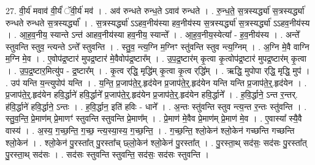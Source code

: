 \documentclass[17pt]{extarticle}
\begin{document}
27. वी॒र्य॑ मवाव॑ वी॒र्यं॑ ॅवी॒र्य॑ मव॑ । . अव॑ रुन्धते रुन्ध॒ते ऽवाव॑ रुन्धते । . रु॒न्ध॒ते॒ स॒त्रस्यर्द्ध्या॑ स॒त्रस्यर्द्ध्या॑ रुन्धते रुन्धते स॒त्रस्यर्द्ध्या᳚ । . स॒त्रस्यर्द्ध्या॑ ऽऽहव॒नीय॑स्या हव॒नीय॑स्य स॒त्रस्यर्द्ध्या॑ स॒त्रस्यर्द्ध्या॑ ऽऽहव॒नीय॑स्य । . आ॒ह॒व॒नीय॒ स्यान्ते ऽन्त॑ आहव॒नीय॑स्या हव॒नीय॒ स्यान्ते᳚ । . आ॒ह॒व॒नीय॒स्येत्या᳚ - ह॒व॒नीय॑स्य । . अन्ते᳚ स्तुवन्ति स्तुव॒ न्त्यन्ते ऽन्ते᳚ स्तुवन्ति । . स्तु॒व॒ न्त्य॒ग्नि म॒ग्निꣳ स्तु॑वन्ति स्तुव न्त्य॒ग्निम् । . अ॒ग्नि मे॒वै वाग्नि म॒ग्नि मे॒व । . ए॒वोप॑द्र॒ष्टार॑ मुपद्र॒ष्टार॑ मे॒वैवोप॑द्र॒ष्टार᳚म् । . उ॒प॒द्र॒ष्टार॑म् कृ॒त्वा कृ॒त्वोप॑द्र॒ष्टार॑ मुपद्र॒ष्टार॑म् कृ॒त्वा । . उ॒प॒द्र॒ष्टार॒मित्यु॑प - द्र॒ष्टार᳚म् । . कृ॒त्व र्‌द्धि॒ मृद्धि॑म् कृ॒त्वा कृ॒त्व र्‌द्धि᳚म् । . ऋद्धि॒ मुपोपा र्‌द्धि॒ मृद्धि॒ मुप॑ । . उप॑ यन्ति य॒न्त्युपोप॑ यन्ति । . य॒न्ति॒ प्र॒जाप॑ते॒र्॒.हृद॑येन प्र॒जाप॑ते॒र्॒.हृद॑येन यन्ति यन्ति प्र॒जाप॑ते॒र्॒.हृद॑येन । . प्र॒जाप॑ते॒र्॒.हृद॑येन हवि॒र्द्धाने॑ हवि॒र्द्धाने᳚ प्र॒जाप॑ते॒र्॒.हृद॑येन प्र॒जाप॑ते॒र्॒.हृद॑येन हवि॒र्द्धाने᳚ । . ह॒वि॒र्द्धाने॒ ऽन्त र॒न्तर्. ह॑वि॒र्द्धाने॑ हवि॒र्द्धाने॒ ऽन्तः । . ह॒वि॒र्द्धान॒ इति॑ हविः - धाने᳚ । . अ॒न्तः स्तु॑वन्ति स्तुव न्त्य॒न्त र॒न्तः स्तु॑वन्ति । . स्तु॒व॒न्ति॒ प्रे॒माण॑म् प्रे॒माणꣳ॑ स्तुवन्ति स्तुवन्ति प्रे॒माण᳚म् । . प्रे॒माण॑ मे॒वैव प्रे॒माण॑म् प्रे॒माण॑ मे॒व । . ए॒वास्या᳚ स्यै॒वै वास्य॑ । . अ॒स्य॒ ग॒च्छ॒न्ति॒ ग॒च्छ॒ न्त्य॒स्या॒स्य॒ ग॒च्छ॒न्ति॒ । . ग॒च्छ॒न्ति॒ श्लो॒केन॑ श्लो॒केन॑ गच्छन्ति गच्छन्ति श्लो॒केन॑ । . श्लो॒केन॑ पु॒रस्ता᳚त् पु॒रस्ता᳚च् छ्लो॒केन॑ श्लो॒केन॑ पु॒रस्ता᳚त् । . पु॒रस्ता॒थ् सद॑सः॒ सद॑सः पु॒रस्ता᳚त् पु॒रस्ता॒थ् सद॑सः । . सद॑सः स्तुवन्ति स्तुवन्ति॒ सद॑सः॒ सद॑सः स्तुवन्ति । \newline
\end{document}
